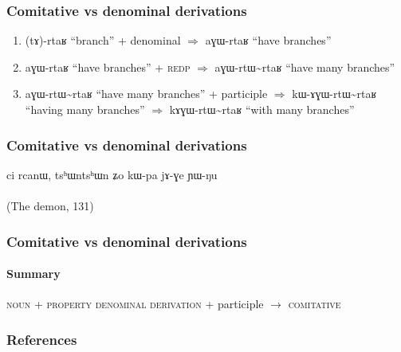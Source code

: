 \documentclass[xcolor=table]{beamer}
\newcommand{\ipa}[1]{{\phon \mbox{#1}}} %
\begin{document}
 
      \begin{frame} 
\frametitle{Comitative vs denominal derivations} 
 
 \begin{enumerate}
\item \ipa{(tɤ)-rtaʁ} ``branch'' + denominal $\Rightarrow$  \ipa{aɣɯ-rtaʁ} ``have branches''
\item  \ipa{aɣɯ-rtaʁ} ``have branches'' + \textsc{redp} $\Rightarrow$  \ipa{aɣɯ-rtɯ\textasciitilde{}rtaʁ} ``have many branches'' 
\item \ipa{aɣɯ-rtɯ\textasciitilde{}rtaʁ} ``have many branches'' + participle $\Rightarrow$  \ipa{kɯ-ɤɣɯ-rtɯ\textasciitilde{}rtaʁ} ``having many branches''  $\Rightarrow$ \ipa{kɤɣɯ-rtɯ\textasciitilde{}rtaʁ} ``with many branches'' 
\end{enumerate}
 \end{frame}    

      \begin{frame} 
\frametitle{Comitative vs denominal derivations} 
\begin{exe}
\ex
\gll \ipa{kɤɣɯ-tɤ-snɯ\textasciitilde{}sno}  	\ipa{ci}  	\ipa{rcanɯ,}  	\ipa{tsʰɯntsʰɯn}  	\ipa{ʑo}  	\ipa{kɯ-pa}  	\ipa{jɤ-ɣe}  	\ipa{ɲɯ-ŋu}  	\\
\\
\glt (The demon, 131)
\end{exe}

 \end{frame}    
 
     \begin{frame} 
\frametitle{Comitative vs denominal derivations} 
\framesubtitle{Summary}
 \begin{exe}
\ex
 \glt  \textsc{noun} + \textsc{property denominal derivation} + participle $\rightarrow$ \textsc{comitative}
\end{exe} 


 \end{frame}    
 
 
 \begin{frame} 
 \frametitle{References}
 \tiny
 

 \end{frame}
\end{document}
